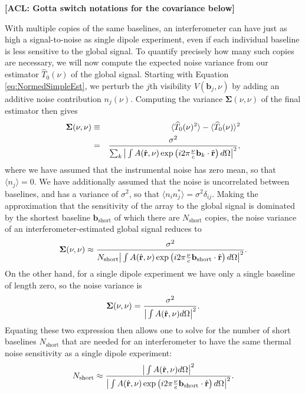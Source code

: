 \documentclass[twolcolumn,apj,iop,numberedappendix]{emulateapj}
\newcommand{\rhat}{\hat{\mathbf{r}}}
\newcommand{\acl}[1]{{\color{red} \textbf{[ACL:  #1]}}}
\begin{document}
\acl{Gotta switch notations for the covariance below}

With multiple copies of the same baselines, an interferometer can have just as high a signal-to-noise as single dipole experiment, even if each individual baseline is less sensitive to the global signal. To quantify precisely how many such copies are necessary, we will now compute the expected noise variance from our estimator $\widehat{T}_0 (\nu) $ of the global signal. Starting with Equation \eqref{eq:NormedSimpleEst}, we perturb the $j$th visibility $V(\mathbf{b}_j, \nu)$ by adding an additive noise contribution $n_j (\nu)$. Computing the variance $\boldsymbol \Sigma(\nu,\nu)$ of the final estimator then gives
\begin{eqnarray}
\boldsymbol \Sigma(\nu,\nu) &\equiv& \langle \widehat{T}_0 (\nu)^2 \rangle - \langle  \widehat{T}_0 (\nu) \rangle^2 \nonumber \\
&=&  \frac{\sigma^2}{ \sum_k \big{|} \int  A(\rhat, \nu) \exp\left(i 2\pi \frac{\nu }{c}\mathbf{b}_k \cdot \rhat \right)d\Omega \big{|}^2},
\end{eqnarray}
where we have assumed that the instrumental noise has zero mean, so that $\langle n_j \rangle = 0$. We have additionally assumed that the noise is uncorrelated between baselines, and has a variance of $\sigma^2$, so that $\langle n_i n_j^* \rangle = \sigma^2 \delta_{ij}$. Making the approximation that the sensitivity of the array to the global signal is dominated by the shortest baseline $\mathbf{b}_\textrm{short}$ of which there are $N_\textrm{short}$ copies, the noise variance of an interferometer-estimated global signal reduces to
\begin{equation}
\boldsymbol \Sigma(\nu,\nu) \approx \frac{\sigma^2}{ N_\textrm{short} \big{|} \int  A(\rhat, \nu) \exp\left(i 2\pi \frac{\nu }{c}\mathbf{b}_\textrm{short} \cdot \rhat \right)d\Omega \big{|}^2}.
\end{equation}
On the other hand, for a single dipole experiment we have only a single baseline of length zero, so the noise variance is
\begin{equation}
\boldsymbol \Sigma(\nu,\nu) = \frac{\sigma^2}{\big{|} \int  A(\rhat, \nu) d\Omega \big{|}^2}.
\end{equation}
Equating these two expression then allows one to solve for the number of short baselines $N_\textrm{short}$ that are needed for an interferometer to have the same thermal noise sensitivity as a single dipole experiment:
\begin{equation}
N_\textrm{short} \approx  \frac{\big{|} \int  A(\rhat, \nu) d\Omega \big{|}^2}{  \big{|} \int  A(\rhat, \nu) \exp\left(i 2\pi \frac{\nu }{c}\mathbf{b}_\textrm{short} \cdot \rhat \right)d\Omega \big{|}^2}.
\end{equation}
\end{document}
